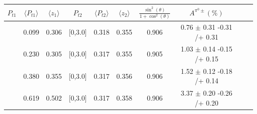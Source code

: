 \begin{table}[H]\scriptsize
\centering
\begin{tabular}{|c| c| c| c| c| c| c| c| c| c|}
\hline
$P_{t1}$   & $\langle  P_{t1}  \rangle$ & $\langle  z_1 \rangle$& $P_{t2}$  & $\langle  P_{t2}\rangle$  &  $\langle  z_2 \rangle$  &$\frac{\sin^2(\theta)}{1+\cos^2(\theta)}$&  $A^{\pi^0\pm}(\%)$  \\ \hline
[0,0.15]	&	0.099	&	0.306	&	[0,3.0]	&	0.318	&	0.355	&	0.906	&	0.76	$\pm$ 	0.31	-0.31	/+	0.31	\\ \hline
[0.15,0.3]	&	0.230	&	0.305	&	[0,3.0]	&	0.317	&	0.355	&	0.905	&	1.03	$\pm$	0.14	-0.15	/+	0.15	\\ \hline
[0.3,0.5]	&	0.380	&	0.355	&	[0,3.0]	&	0.317	&	0.356	&	0.906	&	1.52	$\pm$	0.12	-0.18	/+	0.14	\\ \hline
[0.5,3.0]	&	0.619	&	0.502	&	[0,3.0]	&	0.317	&	0.358	&	0.906	&	3.37	$\pm$	0.20	-0.26	/+	0.20	\\ \hline
													

\end{tabular}
\end{table}
